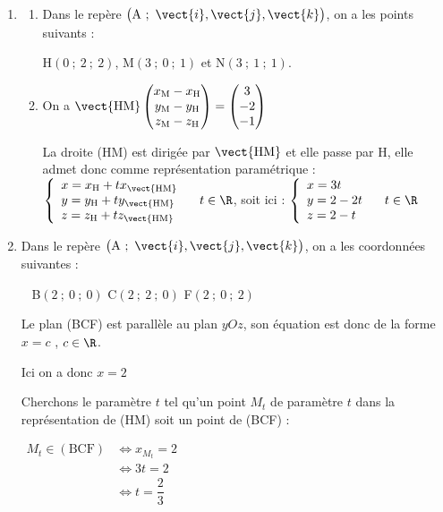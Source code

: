 \begin{enumerate}
\item
	\begin{enumerate}
		\item Dans le repère $\big(\mathrm{A}~;~\vect{i},\vect{j},\vect{k}\big)$, on a les points suivants :

H$(0~;~2~;~2)$,  M$ (3~;~0~;~1) $ et N$(3~;~1~;~1)$. \hfill

\item On a  $\vect{\mathrm{HM}}\begin{pmatrix} x_\mathrm{M}-x_\mathrm{H}\\y_\mathrm{M}-y_\mathrm{H}\\z_\mathrm{M}-z_\mathrm{H} \end{pmatrix} = \begin{pmatrix} 3\\-2\\-1\end{pmatrix}$

La droite (HM) est dirigée par $\vect{\mathrm{HM}}$ et elle passe par H, elle admet donc comme représentation paramétrique : $ \left\{\begin{array}{l} x=x_\mathrm{H} + tx_{\vect{\mathrm{HM}}}\\y=y_\mathrm{H} + ty_{\vect{\mathrm{HM}}}\\z=z_\mathrm{H} + tz_{\vect{\mathrm{HM}}} \end{array}\right. \quad t \in \R $, soit ici : $ \left\{\begin{array}{l} x=3t\\y=2 -2 t\\z=2-t \end{array}\right. \quad t \in \R $
	\end{enumerate}
\item  Dans le repère $\big(\mathrm{A}~;~\vect{i},\vect{j},\vect{k}\big)$, on a les coordonnées suivantes :

\hfill~ B$(2~;~0~;~0)$ \hfill C$ (2~;~2~;~0) $ \hfill F$(2~;~0~;~2)$ \hfill

Le plan (BCF) est parallèle au plan $yOz$, son équation est donc de la forme $x=c$ , $c\in\R$.

Ici on a donc $x=2$

Cherchons le paramètre $t$ tel qu'un point $M_t$ de paramètre $t$ dans la représentation de (HM) soit un point de (BCF) :

	$\begin{aligned} M_t \in (\mathrm{BCF}) &\iff x_{M_t} = 2\\
	&\iff 3t=2\\
	&\iff t = \dfrac{2}{3}\\ \end{aligned}$


\end{enumerate}
